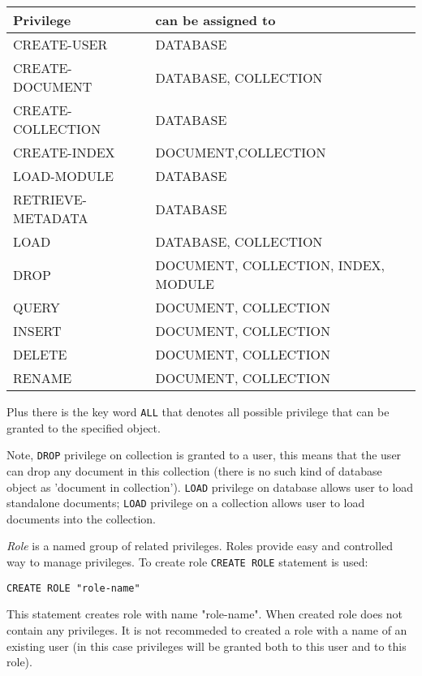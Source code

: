 \documentclass[a4paper,12pt]{article}
\begin{document}
\begin{tabular}{|l|l|}
\hline
\hline
Privilege            & can be assigned to             \\
\hline
\hline
CREATE-USER          & DATABASE                       \\
\hline
CREATE-DOCUMENT      & DATABASE, COLLECTION           \\
\hline
CREATE-COLLECTION    & DATABASE                       \\
\hline
CREATE-INDEX         & DOCUMENT,COLLECTION            \\
\hline
LOAD-MODULE          & DATABASE                       \\
\hline
RETRIEVE-METADATA    & DATABASE                       \\
\hline
LOAD                 & DATABASE, COLLECTION           \\
\hline
DROP                 & DOCUMENT, COLLECTION, INDEX, MODULE    \\
\hline
QUERY                & DOCUMENT, COLLECTION           \\
\hline
INSERT               & DOCUMENT, COLLECTION           \\
\hline
DELETE               & DOCUMENT, COLLECTION           \\
\hline
RENAME               & DOCUMENT, COLLECTION           \\
\hline
\end{tabular}

Plus there is the key word \verb!ALL! that denotes all possible privilege that can be granted to the specified object.

Note, \verb!DROP! privilege on collection is granted to a user, this means that the user can drop any document in this collection (there is no such kind of database object as 'document in collection'). \verb!LOAD! privilege on database allows user to load standalone documents; \verb!LOAD! privilege on a collection allows user to load documents into the collection.

\emph{Role} is a named group of related privileges. Roles provide easy and controlled way to manage privileges. To create role \verb!CREATE ROLE! statement is used:

\begin{verbatim}
CREATE ROLE "role-name"
\end{verbatim}

This statement creates role with name "role-name". When created role does not contain any privileges. It is not recommeded to created a role with a name of an existing user (in this case privileges will be granted both to this user and to this role).
\end{document}
